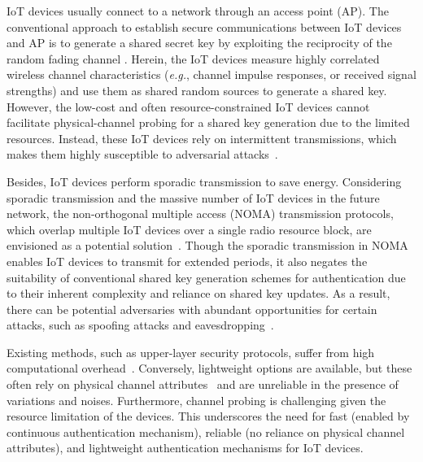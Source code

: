 \documentclass[journal,10pt]{IEEEtran}
\begin{document}
IoT devices usually connect to a network through an access point (AP). The conventional approach to establish secure communications between IoT devices and AP is to generate a shared secret key by exploiting the reciprocity of the random fading channel \cite{hershey1995unconventional, patwari2009high}. Herein, the IoT devices measure highly correlated wireless channel characteristics (\emph{e.g.}, channel impulse responses, or received signal strengths) and use them as shared random sources to generate a shared key. However, the low-cost and often resource-constrained IoT devices cannot facilitate physical-channel probing for a shared key generation due to the limited resources. Instead, these IoT devices rely on intermittent transmissions, which makes them highly susceptible to adversarial attacks~\cite{xu2016security}.

Besides, IoT devices perform sporadic transmission to save energy. Considering sporadic transmission and the massive number of IoT devices in the future network, the non-orthogonal multiple access (NOMA) transmission protocols, which overlap multiple IoT devices over a single radio resource block, are envisioned as a potential solution~\cite{shahab2020grant, 10178037}. Though the sporadic transmission in NOMA enables IoT devices to transmit for extended periods, it also negates the suitability of conventional shared key generation schemes for authentication due to their inherent complexity and reliance on shared key updates. As a result, there can be potential adversaries with abundant opportunities for certain attacks, such as spoofing attacks and eavesdropping~\cite{stellios2018survey, hassan2019current}. 

Existing methods, such as upper-layer security protocols, suffer from high computational overhead~\cite{lin2017survey}. Conversely, lightweight options are available, but these often rely on physical channel attributes~\cite{10012482, 9851464} and are unreliable in the presence of variations and noises. Furthermore, channel probing is challenging given the resource limitation of the devices. This underscores the need for fast (enabled by continuous authentication mechanism), reliable (no reliance on physical channel attributes), and lightweight authentication mechanisms for IoT devices.
\end{document}
